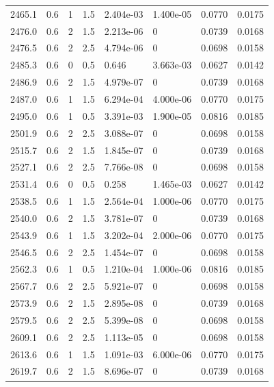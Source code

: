 \documentclass[preview]{standalone}
\begin{document}
{{{{{{\begin{tabular}{L{1.2cm}C{1.2cm} C{0.3cm}C{0.5cm} C{1.4cm}C{1.4cm} C{1.4cm}C{1.4cm}}
  2465.1  &   0.6  & 1     & 1.5 &  2.404e-03  & 1.400e-05  & 0.0770 &  0.0175   \\ 
  2476.0  &   0.6  & 2     & 1.5 &  2.213e-06  & 0  & 0.0739 &  0.0168   \\ 
  2476.5  &   0.6  & 2     & 2.5 &  4.794e-06  & 0  & 0.0698 &  0.0158   \\ 
  2485.3  &   0.6  & 0     & 0.5 &  0.646  & 3.663e-03  & 0.0627 &  0.0142   \\ 
  2486.9  &   0.6  & 2     & 1.5 &  4.979e-07  & 0  & 0.0739 &  0.0168   \\ 
  2487.0  &   0.6  & 1     & 1.5 &  6.294e-04  & 4.000e-06  & 0.0770 &  0.0175   \\ 
  2495.0  &   0.6  & 1     & 0.5 &  3.391e-03  & 1.900e-05  & 0.0816 &  0.0185   \\ 
  2501.9  &   0.6  & 2     & 2.5 &  3.088e-07  & 0  & 0.0698 &  0.0158   \\ 
  2515.7  &   0.6  & 2     & 1.5 &  1.845e-07  & 0  & 0.0739 &  0.0168   \\ 
  2527.1  &   0.6  & 2     & 2.5 &  7.766e-08  & 0  & 0.0698 &  0.0158   \\ 
  2531.4  &   0.6  & 0     & 0.5 &  0.258  & 1.465e-03  & 0.0627 &  0.0142   \\ 
  2538.5  &   0.6  & 1     & 1.5 &  2.564e-04  & 1.000e-06  & 0.0770 &  0.0175   \\ 
  2540.0  &   0.6  & 2     & 1.5 &  3.781e-07  & 0  & 0.0739 &  0.0168   \\ 
  2543.9  &   0.6  & 1     & 1.5 &  3.202e-04  & 2.000e-06  & 0.0770 &  0.0175   \\ 
  2546.5  &   0.6  & 2     & 2.5 &  1.454e-07  & 0  & 0.0698 &  0.0158   \\ 
  2562.3  &   0.6  & 1     & 0.5 &  1.210e-04  & 1.000e-06  & 0.0816 &  0.0185   \\ 
  2567.7  &   0.6  & 2     & 2.5 &  5.921e-07  & 0  & 0.0698 &  0.0158   \\ 
  2573.9  &   0.6  & 2     & 1.5 &  2.895e-08  & 0  & 0.0739 &  0.0168   \\ 
  2579.5  &   0.6  & 2     & 2.5 &  5.399e-08  & 0  & 0.0698 &  0.0158   \\ 
  2609.1  &   0.6  & 2     & 2.5 &  1.113e-05  & 0  & 0.0698 &  0.0158   \\ 
  2613.6  &   0.6  & 1     & 1.5 &  1.091e-03  & 6.000e-06  & 0.0770 &  0.0175   \\ 
  2619.7  &   0.6  & 2     & 1.5 &  8.696e-07  & 0  & 0.0739 &  0.0168   \\ 

\end{tabular}}}}}}}
\end{document}
